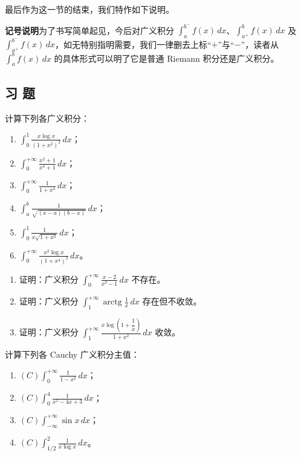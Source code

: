 最后作为这一节的结束，我们特作如下说明。

\textbf{记号说明}\quad 为了书写简单起见，今后对广义积分 $\displaystyle\int_a^{b^-}f(x)\,dx$、$\displaystyle\int_{a^+}^bf(x)\,dx$ 及 $\displaystyle\int_{a^+}^{b^-}f(x)\,dx$，如无特别指明需要，我们一律删去上标“$+$”与“$-$”，读者从 $\displaystyle\int_a^bf(x)\,dx$ 的具体形式可以明了它是普通 Riemann 积分还是广义积分。

\subsection*{习 题}

\begin{exercise}
	\item 计算下列各广义积分：
	\begin{enumerate}[label=\arabic*)]
		\item $\displaystyle\int_0^1\frac{x\log x}{(1+x^2)^2}\,dx$；
		\item $\displaystyle\int_0^{+\infty}\frac{x^2+1}{x^4+1}\,dx$；
		\item $\displaystyle\int_0^{+\infty}\frac{1}{1+x^4}\,dx$；
		\item $\displaystyle\int_a^b\frac{1}{\sqrt{(x-a)(b-x)}}\,dx$；
		\item $\displaystyle\int_0^1\frac{1}{x\sqrt{1+x^2}}\,dx$；
		\item $\displaystyle\int_0^{+\infty}\frac{x^2\log x}{(1+x^4)^3}\,dx$。
	\end{enumerate}
\end{exercise}

\begin{exercise}
	\item
	\begin{enumerate}[label=\arabic*)]
		\item 证明：广义积分 $\displaystyle\int_0^{+\infty}\frac{x-2}{x^3-1}\,dx$ 不存在。
		\item 证明：广义积分 $\displaystyle\int_1^{+\infty}\operatorname{arctg}\frac{1}{x}\,dx$ 存在但不收敛。
		\item 证明：广义积分 $\displaystyle\int_1^{+\infty}\frac{x\log\left(1+\dfrac{1}{x}\right)}{1+x^2}\,dx$ 收敛。
	\end{enumerate}
\end{exercise}

\begin{exercise}
	\item 计算下列各 Cauchy 广义积分主值：
	\begin{enumerate}[label=\arabic*)]
		\item $(C)\displaystyle\int_0^{+\infty}\frac{1}{1-x^2}\,dx$；
		\item $(C)\displaystyle\int_0^4\frac{1}{x^2-4x+3}\,dx$；
		\item $(C)\displaystyle\int_{-\infty}^{+\infty}\sin x\,dx$；
		\item $(C)\displaystyle\int_{1/2}^2\frac{1}{x\log x}\,dx$。
	\end{enumerate}
\end{exercise}

